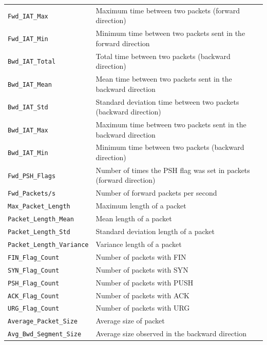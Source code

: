\begin{table}[h!]
\begin{tabular}{l|l}
        \rowcolor{black!10} \texttt{Fwd\_IAT\_Max} & Maximum time between two packets (forward direction) \\
        \texttt{Fwd\_IAT\_Min} & Minimum time between two packets sent in the forward direction \\
        \rowcolor{black!10} \texttt{Bwd\_IAT\_Total} & Total time between two packets (backward direction) \\
        \texttt{Bwd\_IAT\_Mean} & Mean time between two packets sent in the backward direction \\
        \rowcolor{black!10} \texttt{Bwd\_IAT\_Std} & Standard deviation time between two packets (backward direction) \\
        \texttt{Bwd\_IAT\_Max} & Maximum time between two packets sent in the backward direction \\
        \rowcolor{black!10} \texttt{Bwd\_IAT\_Min} & Minimum time between two packets (backward direction) \\
        \texttt{Fwd\_PSH\_Flags} & Number of times the PSH flag was set in packets (forward direction) \\
        \rowcolor{black!10} \texttt{Fwd\_Packets/s} & Number of forward packets per second \\
        \texttt{Max\_Packet\_Length} & Maximum length of a packet \\
        \rowcolor{black!10} \texttt{Packet\_Length\_Mean} & Mean length of a packet \\
        \texttt{Packet\_Length\_Std} & Standard deviation length of a packet \\
        \rowcolor{black!10} \texttt{Packet\_Length\_Variance} & Variance length of a packet \\
        \texttt{FIN\_Flag\_Count} & Number of packets with FIN \\
        \rowcolor{black!10} \texttt{SYN\_Flag\_Count} & Number of packets with SYN \\
        \texttt{PSH\_Flag\_Count} & Number of packets with PUSH \\
        \rowcolor{black!10} \texttt{ACK\_Flag\_Count} & Number of packets with ACK \\
        \texttt{URG\_Flag\_Count} & Number of packets with URG \\
        \rowcolor{black!10} \texttt{Average\_Packet\_Size} & Average size of packet \\
        \texttt{Avg\_Bwd\_Segment\_Size} & Average size observed in the backward direction \\

\end{tabular}
\end{table}
